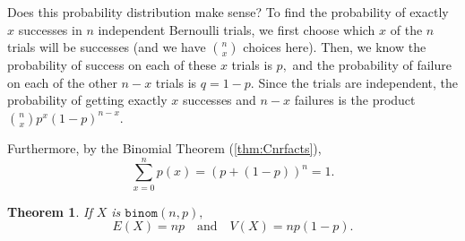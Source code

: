 \documentclass[
]{book}
\newtheorem{theorem}{Theorem}[chapter]
\theoremstyle{definition}
\theoremstyle{definition}
\theoremstyle{definition}
\theoremstyle{definition}
\theoremstyle{remark}
\begin{document}
Does this probability distribution make sense? To find the probability of exactly \(x\) successes in \(n\) independent Bernoulli trials, we first choose which \(x\) of the \(n\) trials will be successes (and we have \(\binom{n}{x}\) choices here). Then, we know the probability of success on each of these \(x\) trials is \(p,\) and the probability of failure on each of the other \(n-x\) trials is \(q = 1-p\). Since the trials are independent, the probability of getting exactly \(x\) successes and \(n-x\) failures is the product \(\binom{n}{x}p^x(1-p)^{n-x}.\)

Furthermore, by the Binomial Theorem (\ref{thm:Cnrfacts}), \[\sum_{x = 0}^n p(x) = (p+(1-p))^n = 1.\]

\begin{theorem}
\protect\hypertarget{thm:binomial-distribution-EandV}{}\label{thm:binomial-distribution-EandV}If \(X\) is \(\texttt{binom}(n,p),\) \[E(X) = np~~~\text{ and }~~~ V(X) = np(1-p).\]
\end{theorem}
\end{document}

